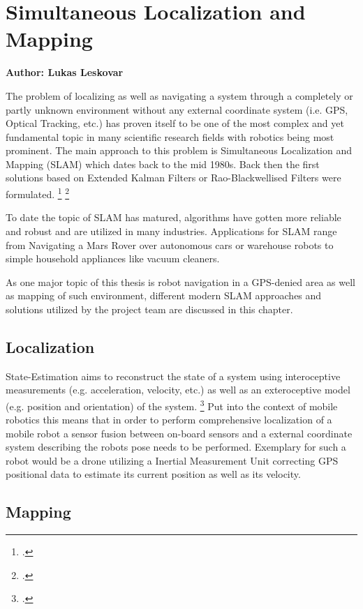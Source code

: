 \chapter{Simultaneous Localization and Mapping}
\label{chapter:slam}

\textbf{Author: Lukas Leskovar} 

The problem of localizing as well as navigating a system through a completely or partly unknown environment without any external coordinate system (i.e. GPS, Optical Tracking, etc.) has proven itself to be one of the most complex and yet fundamental topic in many scientific research fields with robotics being most prominent. The main approach to this problem is Simultaneous Localization and Mapping (SLAM) which dates back to the mid 1980s. Back then the first solutions based on Extended Kalman Filters or Rao-Blackwellised Filters were formulated. \footcite{durrantSlam2006}  \footcite{cadenaSlamFuture2016}

To date the topic of SLAM has matured, algorithms have gotten more reliable and robust and are utilized in many industries. Applications for SLAM range from Navigating a Mars Rover over autonomous cars or warehouse robots to simple household appliances like vacuum cleaners. 

As one major topic of this thesis is robot navigation in a GPS-denied area as well as mapping of such environment, different modern SLAM approaches and solutions utilized by the project team are discussed in this chapter.

\section{Localization}
State-Estimation aims to reconstruct the state of a system using interoceptive measurements (e.g. acceleration, velocity, etc.) as well as an exteroceptive model (e.g. position and orientation) of the system. \footcite{barfootStateEstimation2017}
Put into the context of mobile robotics this means that in order to perform comprehensive localization of a mobile robot a sensor fusion between on-board sensors and a external coordinate system describing the robots pose needs to be performed. 
Exemplary for such a robot would be a drone utilizing a Inertial Measurement Unit correcting GPS positional data to estimate its current position as well as its velocity.


\section{Mapping}



